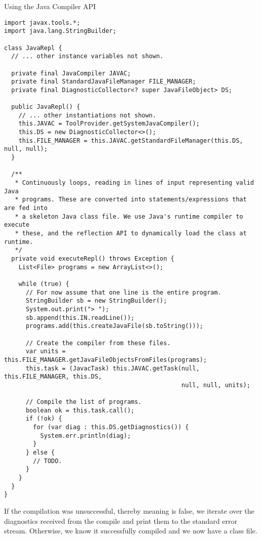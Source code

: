\begin{cl}[]{Using the Java Compiler API}
\begin{lstlisting}[language=MyJava]
import javax.tools.*;
import java.lang.StringBuilder;

class JavaRepl {
  // ... other instance variables not shown.

  private final JavaCompiler JAVAC;
  private final StandardJavaFileManager FILE_MANAGER;
  private final DiagnosticCollector<? super JavaFileObject> DS;

  public JavaRepl() {
    // ... other instantiations not shown.
    this.JAVAC = ToolProvider.getSystemJavaCompiler();
    this.DS = new DiagnosticCollector<>();
    this.FILE_MANAGER = this.JAVAC.getStandardFileManager(this.DS, null, null);
  }

  /**
   * Continuously loops, reading in lines of input representing valid Java
   * programs. These are converted into statements/expressions that are fed into
   * a skeleton Java class file. We use Java's runtime compiler to execute
   * these, and the reflection API to dynamically load the class at runtime.
   */
  private void executeRepl() throws Exception {
    List<File> programs = new ArrayList<>();

    while (true) {
      // For now assume that one line is the entire program.
      StringBuilder sb = new StringBuilder();
      System.out.print("> ");
      sb.append(this.IN.readLine());
      programs.add(this.createJavaFile(sb.toString()));

      // Create the compiler from these files.
      var units = this.FILE_MANAGER.getJavaFileObjectsFromFiles(programs);
      this.task = (JavacTask) this.JAVAC.getTask(null, this.FILE_MANAGER, this.DS,
                                                 null, null, units);

      // Compile the list of programs.
      boolean ok = this.task.call();
      if (!ok) {
        for (var diag : this.DS.getDiagnostics()) {
          System.err.println(diag);
        }
      } else {
        // TODO.
      }
    }
  }
}
\end{lstlisting}
\end{cl}

If the compilation was unsuccessful, thereby meaning  is false, we iterate over the diagnostics received from the compile and print them to the standard error stream. Otherwise, we know it successfully compiled and we now have a class file.

